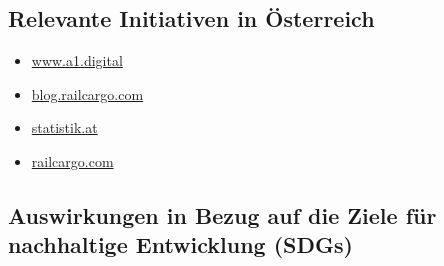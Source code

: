 \documentclass[
]{book}
\providecommand{\tightlist}{%
  \setlength{\itemsep}{0pt}\setlength{\parskip}{0pt}}
\begin{document}
\hypertarget{relevante-initiativen-in-uxf6sterreich-29}{%
\subsection*{Relevante Initiativen in Österreich}\label{relevante-initiativen-in-uxf6sterreich-29}}

\begin{itemize}
\tightlist
\item
  \href{https://www.a1.digital/en-de/about-a1-digital/Press-Releases/OBB-freight-trains-become-smart-with-A1-Digital/}{www.a1.digital}
\item
  \href{https://blog.railcargo.com/en/artikel/smart-cargo-erstmontage}{blog.railcargo.com}
\item
  \href{https://www.statistik.at/web_de/statistiken/energie_umwelt_innovation_mobilitaet/verkehr/schiene/gueterverkehr/index.html}{statistik.at}
\item
  \href{https://www.railcargo.com/de/unternehmen/international/oesterreich}{railcargo.com}
\end{itemize}

\hypertarget{auswirkungen-in-bezug-auf-die-ziele-fuxfcr-nachhaltige-entwicklung-sdgs-29}{%
\subsection*{Auswirkungen in Bezug auf die Ziele für nachhaltige Entwicklung (SDGs)}\label{auswirkungen-in-bezug-auf-die-ziele-fuxfcr-nachhaltige-entwicklung-sdgs-29}}
\end{document}

